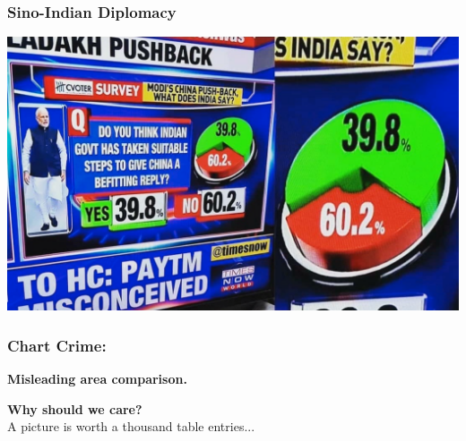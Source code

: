 \documentclass[aspectratio=169]{beamer}
\theoremstyle{principle}
\begin{document}
\begin{frame}
\frametitle{Sino-Indian Diplomacy}
\begin{center}
\includegraphics[scale=0.45]{misleading_pie_chart.png}
\end{center}

\end{frame}

\begin{frame}
\frametitle{Chart Crime:}

\begin{center}
\huge \textbf{Misleading area comparison.}
\end{center}

\end{frame}

\begin{frame}

\begin{center}
\Huge\textbf{Why should we care?}\\
\bigskip
\bigskip
\large A picture is worth a thousand table entries...\\
\end{center}

\end{frame}
\end{document}
